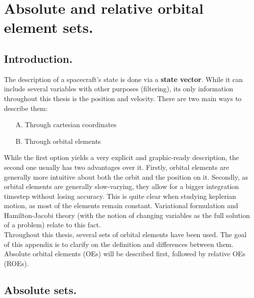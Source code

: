 \chapter{Absolute and relative orbital element sets.}
%
\label{chap: App_OEs}
%
\section{Introduction.}
%
\indent The description of a spacecraft's state is done via a \textbf{state vector}. While it can include several variables with other purposes (\eg filtering), its only information throughout this thesis is the position and velocity. There are two main ways to describe them:\\
%
\begin{itemize}
\item[A.] Through cartesian coordinates
\item[B.] Through orbital elements
\end{itemize}
%
\indent While the first option yields a very explicit and graphic-ready description, the second one usually has two advantages over it. Firstly, orbital elements are generally more intuitive about both the orbit and the position on it. Secondly, as orbital elements are generally slow-varying, they allow for a bigger integration timestep without losing accuracy. This is quite clear when studying keplerian motion, as most of the elements remain constant. Variational formulation and Hamilton-Jacobi theory (with the notion of changing variables as the full solution of a problem) relate to this fact. \\
%
\indent Throughout this thesis, several sets of orbital elements have been used. The goal of this appendix is to clarify on the definition and differences between them. Absolute orbital elements (OEs) will be described first, followed by relative OEs (ROEs).
%
\section{Absolute sets.}
%

